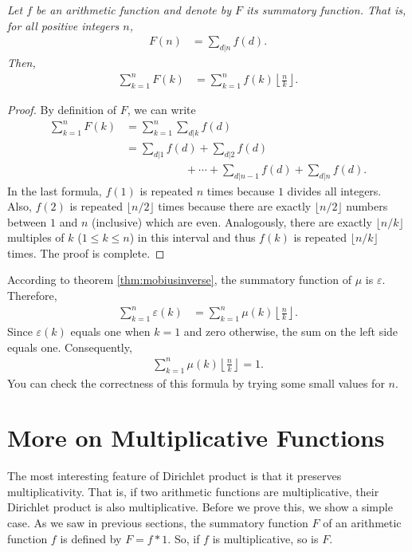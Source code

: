 \documentclass[12pt]{subfile}
\begin{document}
		\begin{theorem}\slshape\label{thm:sum-of-sum-function}
			Let $f$ be an arithmetic function and denote by $F$ its summatory function. That is, for all positive integers $n$,
				\begin{align*}
					F(n) &= \sum_{d|n} f(d).
				\end{align*}
			Then,
				\begin{align*}
					\sum_{k=1}^{n} F(k) &= \sum_{k=1}^{n} f(k) \left\lfloor \frac{n}{k}\right\rfloor.
				\end{align*}
		\end{theorem}
		
		\begin{proof}
			By definition of $F$, we can write
				\begin{align*}
					\sum_{k=1}^{n} F(k) &= \sum_{k=1}^{n} \sum_{d|k} f(d)\\
										&= \sum_{d|1} f(d) + \sum_{d|2} f(d)\\ &\phantom{=} \qquad \qquad +\cdots + \sum_{d|n-1} f(d)+\sum_{d|n} f(d).
				\end{align*}
			In the last formula, $f(1)$ is repeated $n$ times because $1$ divides all integers. Also, $f(2)$ is repeated $\lfloor n/2 \rfloor$ times because there are exactly $\lfloor n/2 \rfloor$ numbers between $1$ and $n$ (inclusive) which are even. Analogously, there are exactly $\lfloor n/k \rfloor$ multiples of $k$ ($1 \leq k \leq n$) in this interval and thus $f(k)$ is repeated $\lfloor n/k \rfloor$ times. The proof is complete.
		\end{proof}
		
		\begin{example}
			According to theorem \eqref{thm:mobiusinverse}, the summatory function of $\mu$ is $\varepsilon$. Therefore,
				\begin{align*}
					\sum_{k=1}^{n} \varepsilon(k) &= \sum_{k=1}^{n} \mu(k) \left\lfloor \frac{n}{k}\right\rfloor.
				\end{align*}
			Since $\varepsilon(k)$ equals one when $k=1$ and zero otherwise, the sum on the left side equals one. Consequently,
				\begin{align*}
					\sum_{k=1}^{n} \mu(k) \left\lfloor \frac{n}{k}\right\rfloor = 1.
				\end{align*}
			You can check the correctness of this formula by trying some small values for $n$.
		\end{example}
		
		
\section{More on Multiplicative Functions}
The most interesting feature of Dirichlet product is that it preserves multiplicativity. That is, if two arithmetic functions are multiplicative, their Dirichlet product is also multiplicative. Before we prove this, we show a simple case. As we saw in previous sections, the summatory function $F$ of an arithmetic function $f$ is defined by $F=f\ast 1$. So, if $f$ is multiplicative, so is $F$. 
\end{document}
